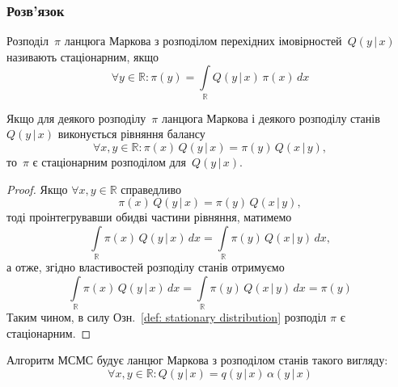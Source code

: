 \subsubsection*{Розв'язок}

\begin{definition}\label{def: stationary distribution}
    Розподіл~$\pi$ ланцюга Маркова з розподілом перехідних імовірностей~$Q(y\, |\, x)$ називають стаціонарним, якщо
    \begin{equation}
        \forall y \in \mathbb{R}: \pi(y) = \int\limits_{\mathbb{R}} Q(y\, |\, x)\,\pi(x)\,dx
    \end{equation} 
\end{definition}

\begin{theorem}\label{theorem: detailed balance}
    Якщо для деякого розподілу~$\pi$ ланцюга Маркова і деякого розподілу станів~$Q(y\, |\, x)$ виконується рівняння балансу
    \begin{equation}
        \forall x,y \in \mathbb{R}: \pi(x)\,Q(y\, |\, x) = \pi(y)\,Q(x\, |\, y),
    \end{equation} 
    то~$\pi$ є стаціонарним розподілом для~$Q(y\, |\, x)$.

    \begin{proof}
        Якщо $\forall x,y \in \mathbb{R}$ справедливо    
        \begin{equation}
            \pi(x)\,Q(y\, |\, x) = \pi(y)\,Q(x\, |\, y),
        \end{equation} 
        тоді проінтегрувавши обидві частини рівняння, матимемо
        \begin{equation}
           \int\limits_{\mathbb{R}}\pi(x)\,Q(y\, |\, x)\,dx = \int\limits_{\mathbb{R}}\pi(y)\,Q(x\, |\, y)\,dx,
        \end{equation}
        а отже, згідно властивостей розподілу станів отримуємо
        \begin{equation}
            \int\limits_{\mathbb{R}}\pi(x)\,Q(y\, |\, x)\,dx = \int\limits_{\mathbb{R}}\pi(y)\,Q(x\, |\, y)\,dx = \pi(y)
        \end{equation}
        Таким чином, в силу Озн.~\ref{def: stationary distribution} розподіл $\pi$ є стаціонарним.
    \end{proof}
\end{theorem}

Алгоритм МСМС будує ланцюг Маркова з розподілом станів такого вигляду:
\begin{equation}
    \forall x,y \in \mathbb{R}: Q(y\, |\, x) = q(y\, |\, x)\,\alpha(y\, |\, x)
\end{equation}

